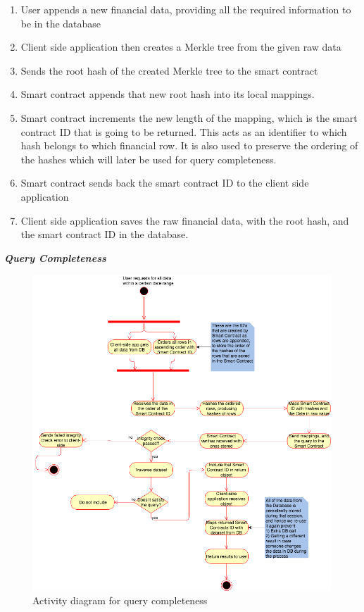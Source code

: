 \begin{enumerate}
\item User appends a new financial data, providing all the required information to be in the database
\item Client side application then creates a Merkle tree from the given raw data
\item Sends the root hash of the created Merkle tree to the smart contract
\item Smart contract appends that new root hash into its local mappings.
\item Smart contract increments the new length of the mapping, which is the smart contract ID that is going to be returned. This acts as an identifier to which hash belongs to which financial row. It is also used to preserve the ordering of the hashes which will later be used for query completeness.
\item Smart contract sends back the smart contract ID to the client side application
\item Client side application saves the raw financial data, with the root hash, and the smart contract ID in the database.
\end{enumerate}

\textbf{\textit{Query Completeness}}

\begin{figure}[h]%
\centering
\includegraphics[width=1.0\textwidth]{images/queryCompleteness.png}
\caption{\label{fig:queryCompleteness}Activity diagram for query completeness}
\end{figure}


